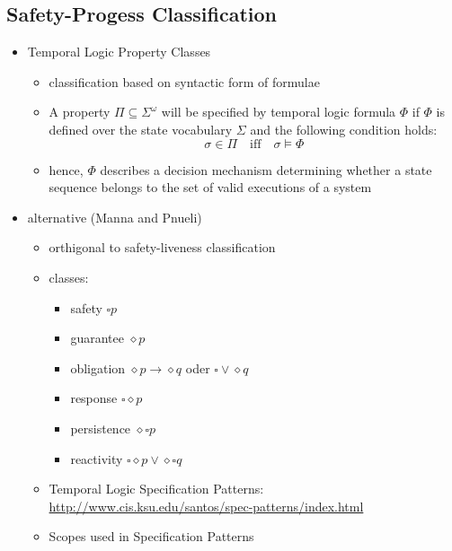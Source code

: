 \documentclass[a4paper, 10pt]{article}
\begin{document}
\subsection*{Safety-Progess Classification}
\begin{itemize}
    \item Temporal Logic Property Classes
    \begin{itemize}
        \item classification based on syntactic form of formulae
        \item A property $\Pi\subseteq\Sigma^\omega$ will be specified by temporal logic formula $\Phi$ if $\Phi$ is defined over the state vocabulary $\Sigma$ and the following condition holds:
        \[ \sigma\in\Pi \quad \textrm{iff} \quad \sigma\models\Phi \]
        \item hence, $\Phi$ describes a decision mechanism determining whether a state sequence belongs to the set of valid executions of a system
    \end{itemize}
    \item alternative (Manna and Pnueli)
    \begin{itemize}
        \item orthigonal to safety-liveness classification
        \item classes:
        \begin{multicols}{2}
        \begin{itemize}
            \item safety $\square p$
            \item guarantee $\diamond p$
            \item obligation $\diamond p\to\diamond q$ oder $\square\vee\diamond q$
            \item response $\square\diamond p$
            \item persistence $\diamond\square p$
            \item reactivity $\square\diamond p\vee\diamond\square q$
        \end{itemize}
        \end{multicols}
        \item Temporal Logic Specification Patterns:
        \url{http://www.cis.ksu.edu/santos/spec-patterns/index.html}
        \item Scopes used in Specification Patterns
        \begin{center}
        \scalebox{.7}{}
        \end{center}
    \end{itemize}
\end{itemize}
\end{document}
